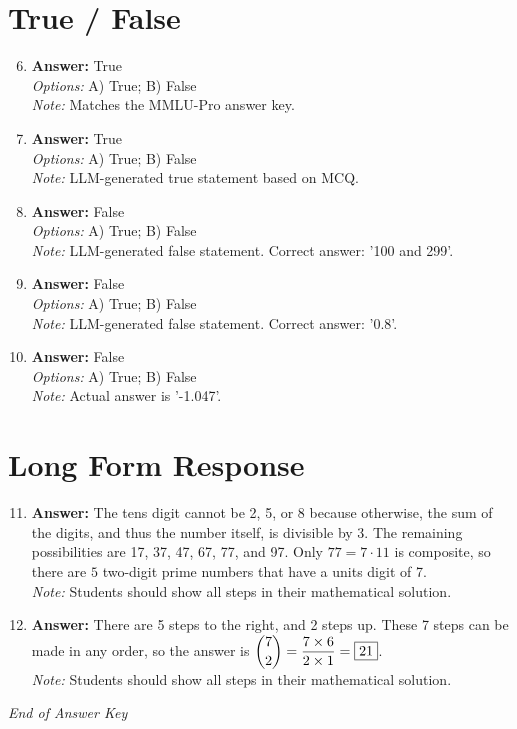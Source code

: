 \documentclass[12pt]{article}
\begin{document}
\section*{True / False}
\begin{enumerate}[label=\arabic*.]
\setcounter{enumi}{5}
\item \textbf{Answer:} True
\\ \textit{Options:} A) True; B) False
\\ \textit{Note:} Matches the MMLU-Pro answer key.
\item \textbf{Answer:} True
\\ \textit{Options:} A) True; B) False
\\ \textit{Note:} LLM-generated true statement based on MCQ.
\item \textbf{Answer:} False
\\ \textit{Options:} A) True; B) False
\\ \textit{Note:} LLM-generated false statement. Correct answer: '100 and 299'.
\item \textbf{Answer:} False
\\ \textit{Options:} A) True; B) False
\\ \textit{Note:} LLM-generated false statement. Correct answer: '0.8'.
\item \textbf{Answer:} False
\\ \textit{Options:} A) True; B) False
\\ \textit{Note:} Actual answer is '-1.047'.
\end{enumerate}

\section*{Long Form Response}
\begin{enumerate}[label=\arabic*.]
\setcounter{enumi}{10}
\item \textbf{Answer:} The tens digit cannot be 2, 5, or 8 because otherwise, the sum of the digits, and thus the number itself, is divisible by 3. The remaining possibilities are 17, 37, 47, 67, 77, and 97. Only $77=7\cdot 11$ is composite, so there are $\boxed{5}$ two-digit prime numbers that have a units digit of 7.
\\ \textit{Note:} Students should show all steps in their mathematical solution.
\item \textbf{Answer:} There are 5 steps to the right, and 2 steps up. These 7 steps can be made in any order, so the answer is $\dbinom{7}{2} = \dfrac{7 \times 6}{2 \times 1} = \boxed{21}$.
\\ \textit{Note:} Students should show all steps in their mathematical solution.
\end{enumerate}

\vfill
\noindent\textit{End of Answer Key}
\end{document}
